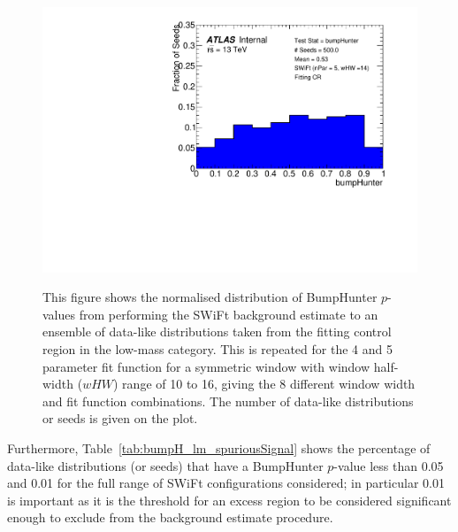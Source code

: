 \begin{figure}[!htb]
{}                                                                                              
 {                                                    
  \includegraphics[width=0.45\linewidth, angle=0]{figs/Dibjet/LowMass/FitStudy_min566/pVal_bumpHunter_corrFitCR_5para_low14_high14.pdf}
}                                                                                              

\caption{\label{fig:bumpH_spuriousSignal}
  This figure shows the normalised distribution of {\sc BumpHunter} \mbox{$p$-value}s from performing the SWiFt background estimate to an ensemble of
  data-like distributions taken from the fitting control region in the low-mass category.
  This is repeated for the 4 and 5 parameter fit function for a symmetric window with window half-width ($wHW$) range of 10 to 16,
  giving the 8 different window width and fit function combinations.
  The number of data-like distributions or seeds is given on the plot.
}
\end{figure}

Furthermore, Table~\ref{tab:bumpH_lm_spuriousSignal} shows the percentage of data-like distributions (or seeds)
that have a {\sc BumpHunter} \mbox{$p$-value} less than %
0.05 and 0.01 for the full range of SWiFt configurations considered;
in particular 0.01 is important as it is the threshold for an excess region to be considered significant enough
to exclude from the background estimate procedure.

